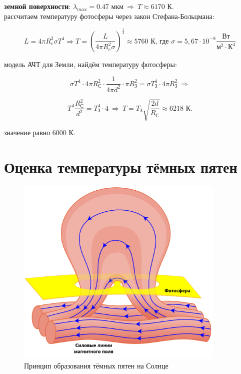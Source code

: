 \documentclass[a4paper,12pt]{article}
\begin{document}
 \textbf{земной поверхности}: $\lambda_{max} = 0.47 \text{ мкм}\ \Rightarrow\ T \approx 6170$ К.\\


 рассчитаем температуру фотосферы через закон Стефана-Больцмана:

\[
L = 4\pi R_{c}^2 \sigma T^4 \Rightarrow T = \left (\frac{L}{4 \pi R_{c}^2 \sigma}\right)^{\frac{1}{4}} \approx 5760 \text{ К, где } \sigma = 5,67 \cdot 10^{-8} \frac{\text{Вт}}{\text{м}^2\cdot\text{К}^4}
\]

 модель АЧТ для Земли, найдём температуру фотосферы:

\[
\sigma T^4 \cdot 4 \pi R_{\text{С}}^2 \cdot \frac{1}{4 \pi d^2} \cdot \pi R_{\text{З}}^2 = \sigma T_{\text{З}}^4 \cdot 4 \pi R_{\text{З}}^2\ \Rightarrow
\]

\[
T^4 \frac{R_{\text{С}}^2}{d^2} = T_{\text{З}}^4 \cdot 4\ \Rightarrow\
T = T_{\text{З}} \sqrt{\frac{2d}{R_{\text{С}}}} \approx 6218 \text{ К}.
\]

 значение равно 6000 К.

\section*{Оценка температуры тёмных пятен}

\begin{figure}[H]
		\centering
		\includegraphics[width=100mm]{Images/Sunspot_diagram.svg.png}
        \caption{Принцип образования тёмных пятен на Солнце}
        
\end{figure}
\end{document}
